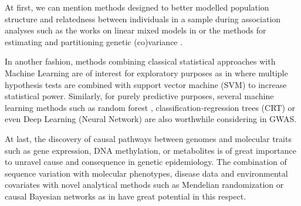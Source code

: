 \documentclass[]{book}
\begin{document}
At first, we can mention methods designed to better modelled population
structure and relatedness between individuals in a sample during
association analyses such as the works on linear mixed models in
\citep{listgarten_improved_2012, segura2012efficient, kang2010variance} or
the methods for estimating and partitioning genetic (co)variance
\citep{finucane2015partitioning, yang2010common}.

In another fashion, methods combining classical statistical approaches
with Machine Learning are of interest for exploratory purposes as in
\citep{mieth2016combining} where multiple hypothesis tests are combined with
support vector machine (SVM) to increase statistical power. Similarly,
for purely predictive purposes, several machine learning methods such as
random forest \citep{geurst_exploiting_2014}, classification-regression trees
(CRT) \citep{maciukiewicz2018gwas} or even Deep Learning (Neural Network)
\citep{fergus2018utilising} are also worthwhile considering in GWAS.

At last, the discovery of causal pathways between genomes and molecular
traits such as gene expression, DNA methylation, or metabolites is of
great importance to unravel cause and consequence in genetic
epidemiology. The combination of sequence variation with molecular
phenotypes, disease data and environmental covariates with novel
analytical methods such as Mendelian randomization
\citep{davey2003mendelian, zhu2018causal} or causal Bayesian networks as in
\citep{rau2013joint} have great potential in this respect.


\end{document}
